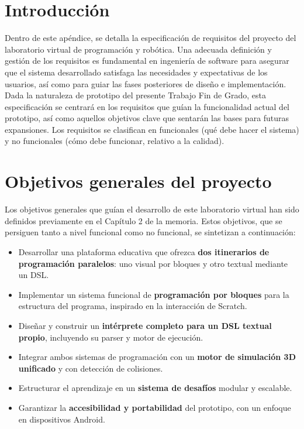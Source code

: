 
\section{Introducción}
Dentro de este apéndice, se detalla la especificación de requisitos del proyecto del laboratorio virtual de programación y robótica. Una adecuada definición y gestión de los requisitos es fundamental en ingeniería de software para asegurar que el sistema desarrollado satisfaga las necesidades y expectativas de los usuarios, así como para guiar las fases posteriores de diseño e implementación. Dada la naturaleza de prototipo del presente Trabajo Fin de Grado, esta especificación se centrará en los requisitos que guían la funcionalidad actual del prototipo, así como aquellos objetivos clave que sentarán las bases para futuras expansiones. Los requisitos se clasifican en funcionales (qué debe hacer el sistema) y no funcionales (cómo debe funcionar, relativo a la calidad).

\section{Objetivos generales del proyecto}
Los objetivos generales que guían el desarrollo de este laboratorio virtual han sido definidos previamente en el Capítulo 2 de la memoria. Estos objetivos, que se persiguen tanto a nivel funcional como no funcional, se sintetizan a continuación:

\begin{itemize}
	\item Desarrollar una plataforma educativa que ofrezca \textbf{dos itinerarios de programación paralelos}: uno visual por bloques y otro textual mediante un DSL.
	\item Implementar un sistema funcional de \textbf{programación por bloques} para la estructura del programa, inspirado en la interacción de Scratch.
	\item Diseñar y construir un \textbf{intérprete completo para un DSL textual propio}, incluyendo su parser y motor de ejecución.
	\item Integrar ambos sistemas de programación con un \textbf{motor de simulación 3D unificado} y con detección de colisiones.
	\item Estructurar el aprendizaje en un \textbf{sistema de desafíos} modular y escalable.
	\item Garantizar la \textbf{accesibilidad y portabilidad} del prototipo, con un enfoque en dispositivos Android.
\end{itemize}

